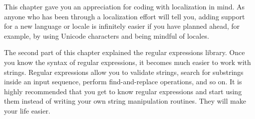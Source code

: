 This chapter gave you an appreciation for coding with localization in mind. As anyone who has been through a localization effort will tell you, adding support for a new language or locale is infinitely easier if you have planned ahead, for example, by using Unicode characters and being mindful of locales.

The second part of this chapter explained the regular expressions library. Once you know the syntax of regular expressions, it becomes much easier to work with strings. Regular expressions allow you to validate strings, search for substrings inside an input sequence, perform find-and-replace operations, and so on. It is highly recommended that you get to know regular expressions and start using them instead of writing your own string manipulation routines. They will make your life easier.